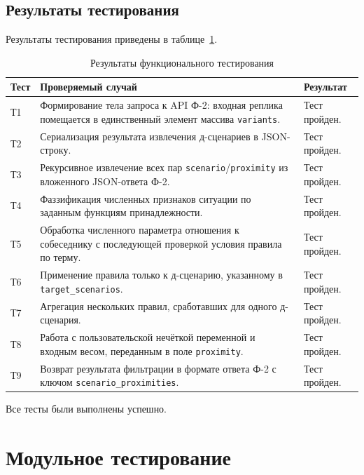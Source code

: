 \section{Результаты тестирования}

Результаты тестирования приведены в таблице~\ref{tbl:functional_test_results}.

\begin{table}[H]
	\centering
	\caption{Результаты функционального тестирования}
	\label{tbl:functional_test_results}
	\begin{tabularx}{\textwidth}{|p{}|X|p{}|}
		\hline
		\textbf{Тест} & \textbf{Проверяемый случай} & \textbf{Результат} \\
		\hline
		Т1 & Формирование тела запроса к API Ф-2: входная реплика помещается
		в единственный элемент массива \texttt{variants}. & Тест пройден. \\
		\hline
		Т2 & Сериализация результата извлечения д-сценариев в JSON-строку. &
		Тест пройден. \\
		\hline
		Т3 & Рекурсивное извлечение всех пар
		\texttt{scenario}/\texttt{proximity} из вложенного JSON-ответа Ф-2. &
		Тест пройден. \\
		\hline
		Т4 & Фаззификация численных признаков ситуации по заданным функциям
		принадлежности. & Тест пройден. \\
		\hline
		Т5 & Обработка численного параметра отношения к собеседнику с
		последующей проверкой условия правила по терму. & Тест пройден. \\
		\hline
		Т6 & Применение правила только к д-сценарию, указанному в
		\texttt{target\_scenarios}. & Тест пройден. \\
		\hline
		Т7 & Агрегация нескольких правил, сработавших для одного
		д-сценария. & Тест пройден. \\
		\hline
		Т8 & Работа с пользовательской нечёткой переменной и входным весом,
		переданным в поле \texttt{proximity}. & Тест пройден. \\
		\hline
		Т9 & Возврат результата фильтрации в формате ответа Ф-2 с ключом
		\texttt{scenario\_proximities}. & Тест пройден. \\
		\hline
	\end{tabularx}
\end{table}

Все тесты были выполнены успешно.

\chapter{Модульное тестирование}

